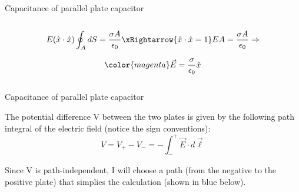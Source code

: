 \begin{frame}{Capacitance of parallel plate capacitor}
\begin{columns}
\begin{column}{0.70\textwidth}
     \begin{equation*}
       E (\hat{x} \cdot \hat{x}) \oint_{A} dS = \frac{\sigma A}{\epsilon_0} \xRightarrow{\hat{x}\cdot\hat{x}=1}
       E A = \frac{\sigma A}{\epsilon_0} \Rightarrow
     \end{equation*}

     \begin{equation*}
        {\color{magenta} \vec{E} = \frac{\sigma}{\epsilon_0} \hat{x} }
     \end{equation*}
  \end{column}
\end{columns}

\end{frame}

%
%
%

\begin{frame}{Capacitance of parallel plate capacitor}

The potential difference V between the two plates is given by the following path
integral of the electric field (notice the sign conventions):
\begin{equation*}
   V = V_{+} - V_{-} = - \int_{-}^{+} \vec{E} \cdot d\vec{\ell}
\end{equation*}

Since V is path-independent, I will choose a path (from the negative to the positive plate)
that simplies the calculation (shown in blue below).


\end{frame}
